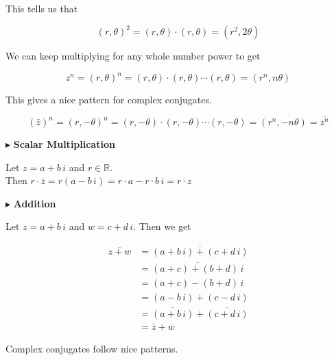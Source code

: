 \documentclass{ximera}
\begin{document}
This tells us that 


\[   (r, \theta)^2 =  (r, \theta) \cdot (r, \theta) = (r^2, 2\theta)                \]



We can keep multiplying for any whole number power to get 


\[   z^n = (r, \theta)^n =  (r, \theta) \cdot (r, \theta) \cdots (r, \theta)= (r^n, n\theta)                \]


This gives a nice pattern for complex conjugates.

\[   (\bar{z})^n = (r, -\theta)^n =  (r, -\theta) \cdot (r, -\theta) \cdots (r, -\theta)= (r^n, -n\theta)  = \overline{z^n}              \]









$\blacktriangleright$ \textbf{Scalar Multiplication}


Let $z = a + b \, i$  and $r \in \mathbb{R}$. \\

Then $r \cdot \bar{z} = r(a - b \, i) = r \cdot a - r \cdot b \, i = \overline{r \cdot z}$







$\blacktriangleright$ \textbf{Addition}


Let $z = a + b \, i$ and $w = c + d \, i$.  Then we get


\begin{align*}
\overline{z + w} & = \overline{(a + b \, i) + (c + d \, i)}  \\
                & = \overline{(a + c) + (b + d) \, i}   \\
                & = (a + c) - (b + d) \, i  \\
                & = (a - b \, i) + (c - d \, i)   \\
                & = \overline{(a + b \, i)} + \overline{(c + d \, i)}  \\
                & = \overline{z} + \overline{w}
\end{align*}





Complex conjugates follow nice patterns. 
\end{document}
